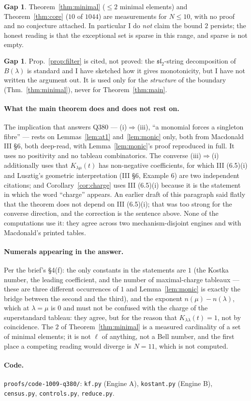 \documentclass[11pt]{article}
\theoremstyle{plain}
\theoremstyle{definition}
\newtheorem{gap}[theorem]{Gap}
\begin{document}
\begin{gap}
Theorem~\ref{thm:minimal} ($\le2$ minimal elements) and Theorem~\ref{thm:core}
($10$ of $1044$) are measurements for $N\le10$, with no proof and no conjecture attached.
In particular I do \emph{not} claim the bound $2$ persists; the honest reading is that
the exceptional set is sparse in this range, and sparse is not empty.
\end{gap}

\begin{gap}
Prop.~\ref{prop:filter} is cited, not proved: the $\mathfrak{sl}_2$-string decomposition
of $B(\lambda)$ is standard and I have sketched how it gives monotonicity, but I have not
written the argument out.  It is used only for the \emph{structure} of the boundary
(Thm.~\ref{thm:minimal}), never for Theorem~\ref{thm:main}.
\end{gap}

\paragraph{What the main theorem does and does not rest on.}
The implication that answers Q380 --- (i)$\Rightarrow$(iii), ``a monomial forces a singleton
fibre'' --- rests on Lemmas~\ref{lem:at1} and~\ref{lem:monic} only, both from Macdonald III
\S6, both deep-read, with Lemma~\ref{lem:monic}'s proof reproduced in full.  It uses no
positivity and no tableau combinatorics.  The converse (iii)$\Rightarrow$(i) additionally
uses that $K_{\lambda\mu}(t)$ has non-negative coefficients, for which III (6.5)(i) and
Lusztig's geometric interpretation (III \S6, Example 6) are two independent citations; and
Corollary~\ref{cor:charge} uses III (6.5)(i) because it is the statement in which the word
``charge'' appears.  An earlier draft of this paragraph said flatly that the theorem does
not depend on III (6.5)(i); that was too strong for the converse direction, and the
correction is the sentence above.  None of the computations use it: they agree across two
mechanism-disjoint engines and with Macdonald's printed tables.

\paragraph{Numerals appearing in the answer.}  Per the brief's \S4(f): the only constants
in the statements are $1$ (the Kostka number, the leading coefficient, and the number of
maximal-charge tableaux --- these are three different occurrences of $1$ and
Lemma~\ref{lem:monic} is exactly the bridge between the second and the third), and the
exponent $n(\mu)-n(\lambda)$, which at $\lambda=\mu$ is $0$ and must not be confused with
the charge of the superstandard tableau: they agree, but for the reason that $K_{\lambda\lambda}(t)=1$,
not by coincidence.  The $2$ of Theorem~\ref{thm:minimal} is a measured cardinality of a
set of minimal elements; it is not $\ell$ of anything, not a Bell number, and the first
place a competing reading would diverge is $N=11$, which is not computed.

\paragraph{Code.}  \texttt{proofs/code-1009-q380/}: \texttt{kf.py} (Engine A),
\texttt{kostant.py} (Engine B), \texttt{census.py}, \texttt{controls.py},
\texttt{reduce.py}.
\end{document}
